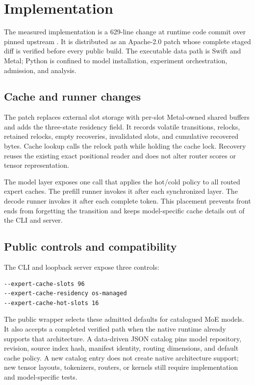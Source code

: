 \section{Implementation}
\label{sec:implementation}

The measured implementation is a 629-line change at runtime code commit
 over pinned upstream . It is distributed as an
Apache-2.0 patch whose complete staged diff is verified before every public
build. The executable data path is Swift and Metal; Python is confined to model
installation, experiment orchestration, admission, and analysis.

\subsection{Cache and runner changes}

The patch replaces external slot storage with per-slot Metal-owned shared
buffers and adds the three-state residency field. It records volatile
transitions, relocks, retained relocks, empty recoveries, invalidated slots, and
cumulative recovered bytes. Cache lookup calls the relock path while holding
the cache lock. Recovery reuses the existing exact positional reader and does
not alter router scores or tensor representation.

The model layer exposes one call that applies the hot/cold policy to all routed
expert caches. The prefill runner invokes it after each synchronized layer. The
decode runner invokes it after each complete token. This placement prevents
front ends from forgetting the transition and keeps model-specific cache
details out of the CLI and server.

\subsection{Public controls and compatibility}

The CLI and loopback server expose three controls:

\begin{verbatim}
--expert-cache-slots 96
--expert-cache-residency os-managed
--expert-cache-hot-slots 16
\end{verbatim}

The public wrapper selects these admitted defaults for catalogued MoE models.
It also accepts a completed verified  path when the native runtime
already supports that architecture. A data-driven JSON catalog pins model
repository, revision, source index hash, manifest identity, routing dimensions,
and default cache policy. A new catalog entry does not create native
architecture support; new tensor layouts, tokenizers, routers, or kernels still
require implementation and model-specific tests.

